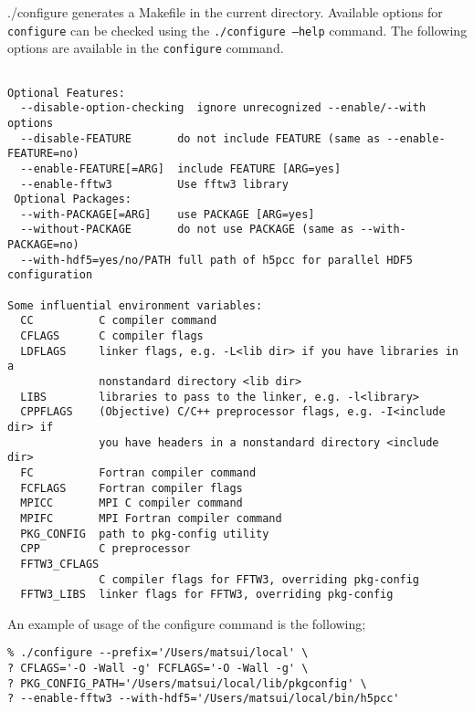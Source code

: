 {./configure} generates a Makefile in the current directory.  Available options for {\tt configure} can be checked using the {\tt ./configure --help} command. The following options are available in the {\tt configure} command.
%
\begin{verbatim}

Optional Features:
  --disable-option-checking  ignore unrecognized --enable/--with options
  --disable-FEATURE       do not include FEATURE (same as --enable-FEATURE=no)
  --enable-FEATURE[=ARG]  include FEATURE [ARG=yes]
  --enable-fftw3          Use fftw3 library 
 Optional Packages:
  --with-PACKAGE[=ARG]    use PACKAGE [ARG=yes]
  --without-PACKAGE       do not use PACKAGE (same as --with-PACKAGE=no)
  --with-hdf5=yes/no/PATH full path of h5pcc for parallel HDF5 configuration

Some influential environment variables:
  CC          C compiler command
  CFLAGS      C compiler flags
  LDFLAGS     linker flags, e.g. -L<lib dir> if you have libraries in a
              nonstandard directory <lib dir>
  LIBS        libraries to pass to the linker, e.g. -l<library>
  CPPFLAGS    (Objective) C/C++ preprocessor flags, e.g. -I<include dir> if
              you have headers in a nonstandard directory <include dir>
  FC          Fortran compiler command
  FCFLAGS     Fortran compiler flags
  MPICC       MPI C compiler command
  MPIFC       MPI Fortran compiler command
  PKG_CONFIG  path to pkg-config utility
  CPP         C preprocessor
  FFTW3_CFLAGS
              C compiler flags for FFTW3, overriding pkg-config
  FFTW3_LIBS  linker flags for FFTW3, overriding pkg-config

\end{verbatim}
%
An example of usage of the configure command is the following;
\begin{verbatim}
% ./configure --prefix='/Users/matsui/local' \
? CFLAGS='-O -Wall -g' FCFLAGS='-O -Wall -g' \
? PKG_CONFIG_PATH='/Users/matsui/local/lib/pkgconfig' \
? --enable-fftw3 --with-hdf5='/Users/matsui/local/bin/h5pcc'

\end{verbatim}

